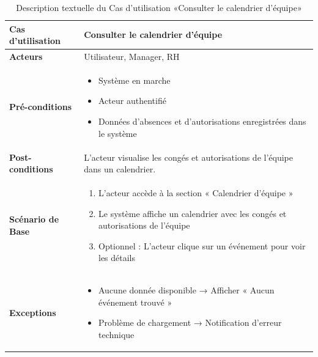     \begin{table}[!ht]
        \vspace*{-1cm}
        \centering
        \caption{Description textuelle du Cas d’utilisation «Consulter le calendrier d’équipe»}
        \label{tab:consult_team_calendar}
        \renewcommand{\arraystretch}{1.2}
        \begin{tabular}{|p{4.2cm}|p{11cm}|}
        \hline
        \textbf{Cas d'utilisation} & Consulter le calendrier d’équipe \\
        \hline
        \textbf{Acteurs} & Utilisateur, Manager, RH \\
        \hline
        \textbf{Pré-conditions} & 
        \begin{itemize}
        \item Système en marche
        \item Acteur authentifié
        \item Données d’absences et d’autorisations enregistrées dans le système
        \end{itemize} \\
        \hline
        \textbf{Post-conditions} & L’acteur visualise les congés et autorisations de l’équipe dans un calendrier. \\
        \hline
        \textbf{Scénario de Base} & 
        \begin{enumerate}
        \item L’acteur accède à la section « Calendrier d’équipe »
        \item Le système affiche un calendrier avec les congés et autorisations de l’équipe
        \item Optionnel : L’acteur clique sur un événement pour voir les détails
        \end{enumerate} \\
        \hline
        \textbf{Exceptions} & 
        \begin{itemize}
        \item Aucune donnée disponible → Afficher « Aucun événement trouvé »
        \item Problème de chargement → Notification d’erreur technique
        \end{itemize} \\
        \hline
        \end{tabular}
    \end{table}

